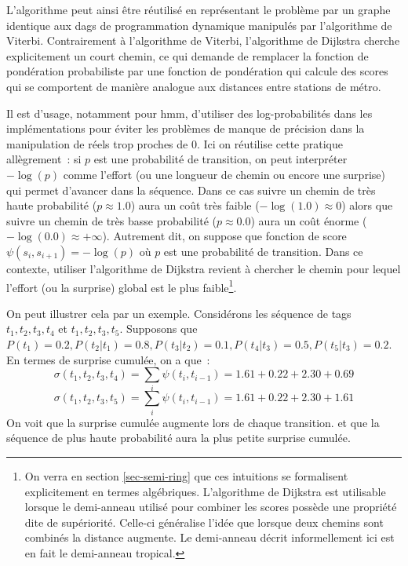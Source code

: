 \documentclass[11pt,openany]{book}
\newcommand{\ac}[1]{{\sc #1}} %
\begin{document}
L'algorithme peut ainsi être réutilisé en représentant le problème par
un graphe identique aux \ac{dags} de programmation dynamique manipulés
par l'algorithme de Viterbi. Contrairement à l'algorithme
de Viterbi, l'algorithme de Dijkstra cherche explicitement un court
chemin, ce qui demande de remplacer la fonction de pondération
probabiliste par une fonction de pondération qui calcule des scores
qui se comportent de manière analogue aux distances entre stations de métro.

Il est d'usage, notamment pour \ac{hmm},
d'utiliser des log-probabilités dans les implémentations pour éviter
les problèmes de manque de précision dans la manipulation de réels
trop proches de 0.  Ici on réutilise cette pratique allègrement~:  si
$p$ est une probabilité de transition, on peut interpréter $-\log(p)$ comme l'effort (ou une longueur de chemin ou encore une surprise) qui permet
d'avancer dans la séquence. Dans ce cas suivre un chemin de très haute
probabilité ($p\approx 1.0$) aura un coût très faible ($-\log(1.0)\approx 0$)
alors que suivre un chemin de très basse probabilité ($p\approx 0.0$)
aura un coût énorme ($-\log(0.0) \approx +\infty$). 
Autrement dit, on suppose que fonction de score $\psi(s_i,s_{i+1}) =
-\log(p)$ où $p$ est une probabilité de transition.
Dans ce contexte, utiliser l'algorithme de Dijkstra revient à chercher
le chemin pour lequel l'effort (ou la surprise) global est le plus
faible\footnote{On verra en section \ref{sec-semi-ring} que ces
  intuitions se formalisent explicitement en termes algébriques. 
L'algorithme de Dijkstra est utilisable lorsque le demi-anneau utilisé pour combiner les
  scores possède une propriété dite de supériorité. Celle-ci
  généralise l'idée que lorsque deux chemins sont combinés la distance
  augmente. Le demi-anneau décrit informellement ici est en fait le demi-anneau tropical.
}.

On peut illustrer cela par un exemple. Considérons les séquence de tags 
$t_1,t_2,t_3,t_4$ et $t_1,t_2,t_3,t_5$. Supposons que $P(t_1) = 0.2, P(t_2|t_1) = 0.8,
P(t_3|t_2) = 0.1,P(t_4|t_3) = 0.5, P(t_5|t_3) = 0.2$. En termes de surprise cumulée, 
on a que~:
\begin{displaymath}
\sigma(t_1,t_2,t_3,t_4) = \sum_{i} \psi(t_{i}, t_{i-1}) = 1.61 + 0.22 + 2.30 + 0.69 
\end{displaymath}
\begin{displaymath}
\sigma(t_1,t_2,t_3,t_5) = \sum_{i} \psi(t_{i} , t_{i-1})  = 1.61 + 0.22 + 2.30 + 1.61 
\end{displaymath}
On voit que la surprise cumulée augmente lors de chaque transition.
et que la séquence de plus haute probabilité aura la plus petite
surprise cumulée. 
\end{document}

